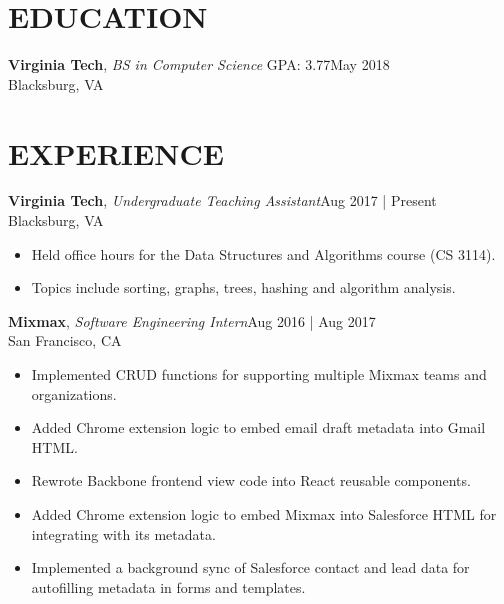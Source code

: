 \documentclass[line,margin]{res}
\begin{document}
\address{vincentl@vt.edu | (703) 992-5598 | github.com/vinnyoodles}
\begin{resume}
	\vspace{-5mm}
	\section{EDUCATION}
	\textbf{Virginia Tech}, {\sl BS in Computer Science} GPA: 3.77\hfill May 2018\\Blacksburg, VA
	\section{EXPERIENCE}
	\textbf{Virginia Tech}, {\sl Undergraduate Teaching Assistant}\hfill Aug 2017 | Present\\Blacksburg, VA\\\begin{itemize} \itemsep 1pt
	\item Held office hours for the Data Structures and Algorithms course (CS 3114).
	\item Topics include sorting, graphs, trees, hashing and algorithm analysis.
	\end{itemize}
	\textbf{Mixmax}, {\sl Software Engineering Intern}\hfill Aug 2016 | Aug 2017\\San Francisco, CA\\\begin{itemize} \itemsep 1pt
	\item Implemented CRUD functions for supporting multiple Mixmax teams and organizations.
	\item Added Chrome extension logic to embed email draft metadata into Gmail HTML.
	\item Rewrote Backbone frontend view code into React reusable components.
	\item Added Chrome extension logic to embed Mixmax into Salesforce HTML for integrating with its metadata.
	\item Implemented a background sync of Salesforce contact and lead data for autofilling metadata in forms and templates.
	\end{itemize}

\end{resume}
\end{document}
